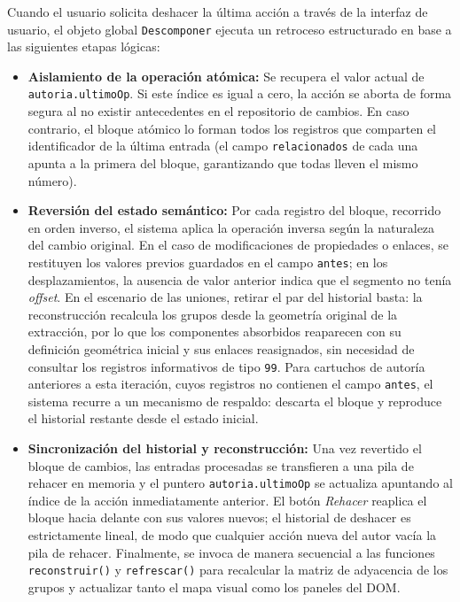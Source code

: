 Cuando el usuario solicita deshacer la última acción a través de la interfaz de usuario, el objeto global \texttt{Descomponer} ejecuta un retroceso estructurado en base a las siguientes etapas lógicas:
\begin{itemize}
	\item \textbf{Aislamiento de la operación atómica:} Se recupera el valor actual de \texttt{autoria.ultimoOp}. Si este índice es igual a cero, la acción se aborta de forma segura al no existir antecedentes en el repositorio de cambios. En caso contrario, el bloque atómico lo forman todos los registros que comparten el identificador de la última entrada (el campo \texttt{relacionados} de cada una apunta a la primera del bloque, garantizando que todas lleven el mismo número).
	\item \textbf{Reversión del estado semántico:} Por cada registro del bloque, recorrido en orden inverso, el sistema aplica la operación inversa según la naturaleza del cambio original. En el caso de modificaciones de propiedades o enlaces, se restituyen los valores previos guardados en el campo \texttt{antes}; en los desplazamientos, la ausencia de valor anterior indica que el segmento no tenía \textit{offset}. En el escenario de las uniones, retirar el par del historial basta: la reconstrucción recalcula los grupos desde la geometría original de la extracción, por lo que los componentes absorbidos reaparecen con su definición geométrica inicial y sus enlaces reasignados, sin necesidad de consultar los registros informativos de tipo \texttt{99}. Para cartuchos de autoría anteriores a esta iteración, cuyos registros no contienen el campo \texttt{antes}, el sistema recurre a un mecanismo de respaldo: descarta el bloque y reproduce el historial restante desde el estado inicial.
	\item \textbf{Sincronización del historial y reconstrucción:} Una vez revertido el bloque de cambios, las entradas procesadas se transfieren a una pila de rehacer en memoria y el puntero \texttt{autoria.ultimoOp} se actualiza apuntando al índice de la acción inmediatamente anterior. El botón \textit{Rehacer} reaplica el bloque hacia delante con sus valores nuevos; el historial de deshacer es estrictamente lineal, de modo que cualquier acción nueva del autor vacía la pila de rehacer. Finalmente, se invoca de manera secuencial a las funciones \texttt{reconstruir()} y \texttt{refrescar()} para recalcular la matriz de adyacencia de los grupos y actualizar tanto el mapa visual como los paneles del DOM.
\end{itemize}

